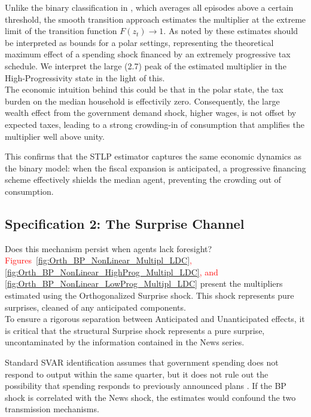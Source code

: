 \documentclass[12pt,letterpaper]{article}
\begin{document}
Unlike the binary classification in \cite{FN}, which averages all episodes above a certain threshold, the smooth transition approach estimates the multiplier at the extreme limit of the transition function $F(z_t) \xrightarrow{}1$.
As noted by \cite{Auerbach_Gorodnichenko_2012_Measuring} these estimates should be interpreted as bounds for a polar settings, representing the theoretical maximum effect of a spending shock financed by an extremely progressive tax schedule. We interpret the large (2.7) peak of the estimated multiplier in the High-Progressivity state in the light of this.
\\
The economic intuition behind this could be that in the polar state, the tax burden on the median household is effectivily zero.
Consequently, the large wealth effect from the government demand shock, higher wages, is not offset by expected taxes, leading to a strong crowding-in of consumption that amplifies the multiplier well above unity. 

This confirms that the STLP estimator captures the same economic dynamics as the \cite{FN} binary model: when the fiscal expansion is anticipated, a progressive financing scheme effectively shields the median agent, preventing the crowding out of consumption.

\subsection{Specification 2: The Surprise Channel}
Does this mechanism persist when agents lack foresight? \textcolor{red}{Figures~\ref{fig:Orth_BP_NonLinear_Multipl_LDC},
\ref{fig:Orth_BP_NonLinear_HighProg_Multipl_LDC}, and \ref{fig:Orth_BP_NonLinear_LowProg_Multipl_LDC} } present the multipliers estimated using the Orthogonalized Surprise \cite{BP} shock. This shock represents pure surprises, cleaned of any anticipated components.
\\
To ensure a rigorous separation between Anticipated and Unanticipated effects, it is critical that the structural Surprise shock \cite{BP} represents a pure surprise, uncontaminated by the information contained in the News series.

Standard SVAR identification assumes that government spending does not respond to output within the same quarter, but it does not rule out the possibility that spending responds to previously announced plans \citep{Ramey2011}. If the BP shock is correlated with the News shock, the estimates would confound the two transmission mechanisms.
\end{document}
